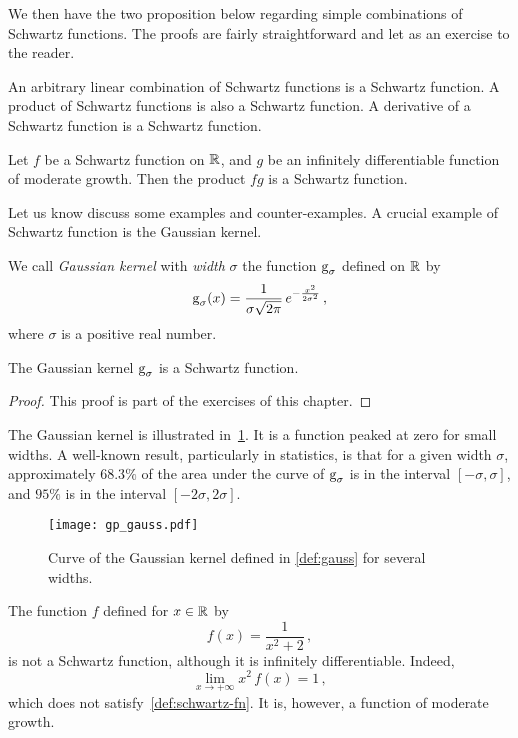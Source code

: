 We then have the two proposition below regarding simple combinations of Schwartz
functions. The proofs are fairly straightforward and let as an exercise to the reader.
\begin{proposition}
  \label{prop:schwartz-comb}
  An arbitrary linear combination of Schwartz functions is a Schwartz function. A product
  of Schwartz functions is also a Schwartz function. A derivative of a Schwartz function
  is a Schwartz function.
\end{proposition}
\begin{proposition}
  Let $f$ be a Schwartz function on $\mathbb{R}$, and $g$ be an infinitely differentiable function
  of moderate growth. Then the product $fg$ is a Schwartz function.
\end{proposition}
Let us know discuss some examples and counter-examples. A crucial example of Schwartz
function is the Gaussian kernel.
\begin{definition}
  \label{def:gauss}
  We call \emph{Gaussian kernel} with \emph{width} $\sigma$ the function $\operatorname{g}_{\sigma}$
  defined on $\mathbb{R}$ by
  \begin{equation}
    \operatorname{g}_{\sigma}(x)=\frac{1}{\sigma\sqrt{2\pi}}\,e^{-\frac{x^2}{2\sigma^2}}\,,
  \end{equation}
  where $\sigma$ is a positive real number.
\end{definition}
\begin{proposition}
  \label{prop:gauss-schwartz}
  The Gaussian kernel $\operatorname{g}_{\sigma}$ is a Schwartz function.
\end{proposition}
\begin{proof}
  This proof is part of the exercises of this chapter.
\end{proof}
The Gaussian kernel is illustrated in~\cref{fig:gauss}. It is a function peaked at zero
for small widths. A well-known result, particularly in statistics, is that for a given
width $\sigma$, approximately $68.3\%$ of the area under the curve of $\operatorname{g}_{\sigma}$ is
in the interval $[-\sigma,\sigma]$, and $95\%$ is in the interval $[-2\sigma,2\sigma]$.
\begin{figure}[t]
  \centering
  \texttt{[image: gp\_gauss.pdf]}
  \caption{Curve of the Gaussian kernel defined in \cref{def:gauss} for several widths.}
  \label{fig:gauss}
\end{figure}
\begin{example}
  The function $f$ defined for $x\in\mathbb{R}$ by
  \begin{equation}
    f(x)=\frac{1}{x^2+2}\,,
  \end{equation}
  is not a Schwartz function, although it is infinitely differentiable. Indeed,
  \begin{equation}
    \lim_{x\to+\infty} x^2\,f(x)=1\,,
  \end{equation}
  which does not satisfy~\cref{def:schwartz-fn}. It is, however, a function of moderate
  growth.
\end{example}
